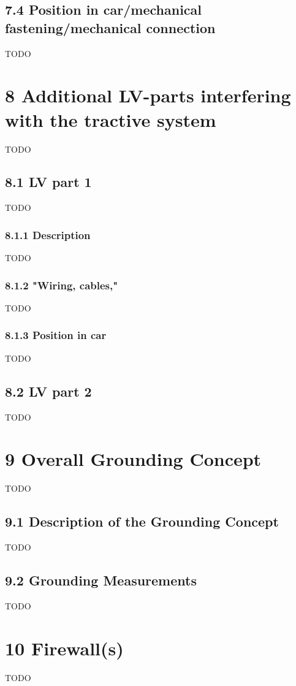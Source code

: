 \documentclass{article}
\begin{document}
\subsection*{7.4 Position in car/mechanical fastening/mechanical connection}
TODO

\section*{8 Additional LV-parts interfering with the tractive system}
TODO

\subsection*{8.1 LV part 1}
TODO

\subsubsection*{8.1.1 Description}
TODO

\subsubsection*{8.1.2 "Wiring, cables,"}
TODO

\subsubsection*{8.1.3 Position in car}
TODO

\subsection*{8.2 LV part 2}
TODO

\section*{9 Overall Grounding Concept}
TODO

\subsection*{9.1 Description of the Grounding Concept}
TODO

\subsection*{9.2 Grounding Measurements}
TODO

\section*{10 Firewall(s)}
TODO
\end{document}
